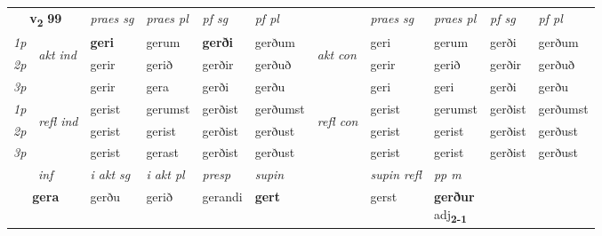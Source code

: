 \noindent
\begin{tabular}{lllllllllll} \toprule
\multicolumn{2}{c}{\textbf{v{\textsubscript{2}}} \Large{\textbf{99}}}  &  \textit{praes sg}  & \textit{praes pl}  &\textit{ pf sg} & \textit{pf pl} &  &  \textit{praes sg}  & \textit{praes pl}  & \textit{pf sg} & \textit{pf pl } \\*
	\cmidrule{3-6} \cmidrule{8-11}
 {\textit{1p}} & \multirow{3}{*}{\begin{turn}{90}\textit{akt ind}\end{turn}} & \textbf{geri} & gerum & \textbf{gerði} & gerðum & \multirow{3}{*}{\begin{turn}{90}\textit{akt con}\end{turn}} &geri & gerum & gerði & gerðum\\*
 {\textit{2p}} &  &  gerir  & gerið & gerðir & gerðuð & & gerir & gerið & gerðir & gerðuð \\*
{\textit{3p}} &  & gerir & gera & gerði & gerðu & & geri & geri& gerði & gerðu \\*
\cmidrule{3-6} \cmidrule{8-11}
 {\textit{1p}} & \multirow{3}{*}{\begin{turn}{90}\textit{refl ind}\end{turn}}  & gerist & gerumst & gerðist & gerðumst & \multirow{3}{*}{\begin{turn}{90}\textit{refl con}\end{turn}}  &gerist & gerumst & gerðist & gerðumst \\*
 {\textit{2p}} &  & gerist & gerist & gerðist & gerðust & &gerist & gerist & gerðist & gerðust \\*
 {\textit{3p}}  & & gerist & gerast & gerðist & gerðust & & gerist & gerist& gerðist & gerðust \\*
\cmidrule{3-6} \cmidrule{8-11}

   \multicolumn{2}{c}{\textit{inf}}  & \textit{i akt sg} & \textit{i akt pl}   & \textit{presp} & \textit{supin} && \textit{supin refl} & \textit{pp m} \\*
  \multicolumn{2}{c}{\textbf{gera}} & gerðu  & gerið   & gerandi &  \textbf{gert} && gerst & \specialcell{\textbf{gerður} \\ adj\textbf{\textsubscript{2-1}}} \\*
\end{tabular}

